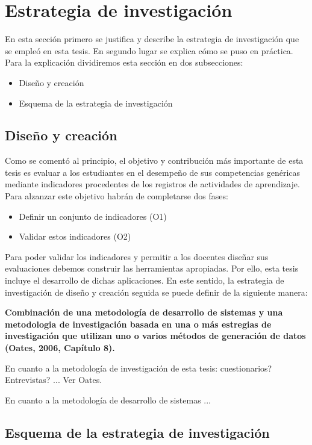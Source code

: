 
\section{Estrategia de investigación}
\label{sec:Estrategia}



En esta sección primero se justifica y describe la estrategia de investigación que se empleó en esta tesis. En segundo lugar se explica cómo se puso en práctica. Para la explicación dividiremos esta sección en dos subsecciones:

\begin{itemize}
\item Diseño y creación
\item Esquema de la estrategia de investigación
\end{itemize}

\subsection{Diseño y creación}

Como se comentó al principio, el objetivo y contribución más importante de esta tesis es evaluar a los estudiantes en el desempeño de sus competencias genéricas mediante indicadores procedentes de los registros de actividades de aprendizaje. Para alzanzar este objetivo habrán de completarse dos fases:

\begin{itemize}
\item Definir un conjunto de indicadores (O1)
\item Validar estos indicadores (O2)
\end{itemize}

Para poder validar los indicadores y permitir a los docentes diseñar sus evaluaciones debemos construir las herramientas apropiadas. Por ello, esta tesis incluye el desarrollo de dichas aplicaciones.  En este sentido, la estrategia de investigación de diseño y creación seguida se puede definir de la siguiente manera:

\bigskip
\textbf{Combinación de una metodología de desarrollo de sistemas y una metodologia de investigación basada en una o más estregias de investigación que utilizan uno o varios métodos de generación de datos (Oates, 2006, Capítulo 8).}
\bigskip


En cuanto a la metodología de investigación de esta tesis: cuestionarios? Entrevistas? ... Ver Oates.

\bigskip
En cuanto a la metodología de desarrollo de sistemas ...

\subsection{Esquema de la estrategia de investigación}
